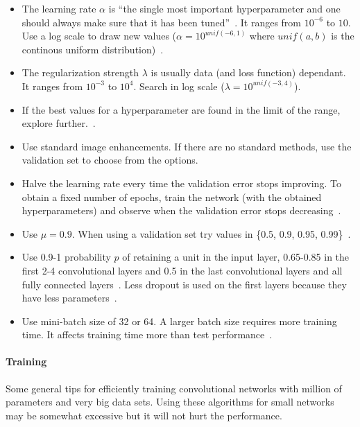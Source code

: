 \begin{itemize}
	\item The learning rate $\alpha$ is ``the single most important hyperparameter and one should always make sure that it has been tuned''~\cite{Bengio2012}. It ranges from $10^{-6}$ to $10$. Use a log scale to draw new values ($\alpha = 10^{unif(-6, 1)}$ where $unif(a,b)$ is the continous uniform distribution)~\cite{Karpathy2015}.

	\item The regularization strength $\lambda$ is usually data (and loss function) dependant. It ranges from $10^{-3}$ to $10^4$. Search in log scale ($\lambda = 10^{unif(-3, 4)}$).

	\item If the best values for a hyperparameter are found in the limit of the range, explore further.~\cite{Bengio2012}.

	\item Use standard image enhancements. If there are no standard methods, use the validation set to choose from the options.

	\item Halve the learning rate every time the validation error stops improving. To obtain a fixed number of epochs, train the network (with the obtained hyperparameters) and observe when the validation error stops decreasing~\cite{Krizhevsky2012}.

	\item Use $\mu=0.9$. When using a validation set try values in \{0.5, 0.9, 0.95, 0.99\}~\cite{Karpathy2015}.

	\item Use 0.9-1 probability $p$ of retaining a unit in the input layer, 0.65-0.85 in the first 2-4 convolutional layers and 0.5 in the last convolutional layers and all fully connected layers~\cite{Srivastava2014}. Less dropout is used on the first layers because they have less parameters~\cite{Karpathy2015}.

	\item Use mini-batch size of 32 or 64. A larger batch size requires more training time. It affects training time more than test performance~\cite{Bengio2012}.

\end{itemize}



\paragraph{Training}
Some general tips for efficiently training convolutional networks with million of parameters and very big data sets. Using these algorithms for small networks may be somewhat excessive but it will not hurt the performance.

